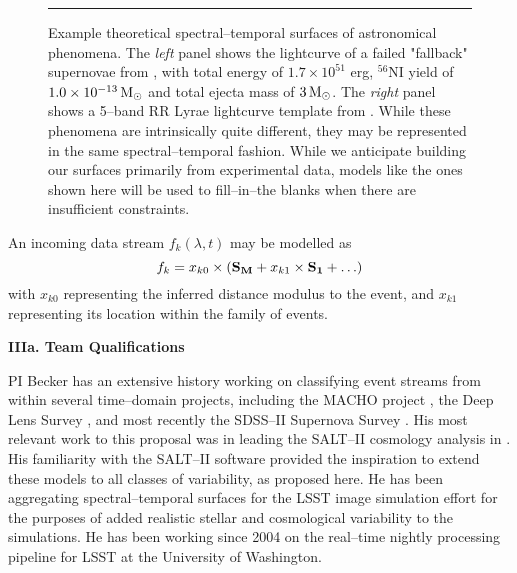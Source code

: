 \begin{figure}[t]
\centerline{ \hfil
{}} \smallskip
\caption[]{\footnotesize Example theoretical spectral--temporal surfaces of
astronomical phenomena.  The {\it left} panel shows the lightcurve of a failed
"fallback" supernovae from \cite{2009ApJ...707..193F}, with total energy of $1.7
\times 10^{51}$ erg, $^{56}$NI yield of $1.0 \times 10^{-13} {\rm\,M_\odot}$ and total
ejecta mass of $3 {\rm\,M_\odot}$.  The {\it right} panel shows a 5--band RR Lyrae
lightcurve template from \cite{2010ApJ...708..717S}.  While these phenomena are
intrinsically quite different, they may be represented in the same
spectral--temporal fashion.  While we anticipate building our surfaces primarily
from experimental data, models like the ones shown here will be used to
fill--in--the blanks when there are insufficient constraints.} \medskip \hrule
\label{fig:sts} \end{figure}


 \smallskip


An incoming data stream $f_{k}(\lambda, t)$ may be modelled as $$f_{k} = x_{k0}
\times ({\bf S_M} + x_{k1} \times {\bf S_1} + \ldots)$$ with $x_{k0}$
representing the inferred distance modulus to the event, and $x_{k1}$
representing its location within the family of events.


 \smallskip





\bigskip \centerline{\bf IIIa. Team Qualifications} \smallskip

 \smallskip

PI Becker has an extensive history working on classifying event streams from
within several time--domain projects, including the MACHO project
\citep{2000PhDT.......258B}, the Deep Lens Survey \citep{2004ApJ...611..418B},
and most recently the SDSS--II Supernova Survey
\citep{2008AJ....135..338F,2008AJ....135..348S}.  His most relevant work to this
proposal was in leading the SALT--II cosmology analysis in
\cite{2009ApJS..185...32K}.  His familiarity with the SALT--II software provided
the inspiration to extend these models to all classes of variability, as
proposed here. He has been aggregating spectral--temporal surfaces for the LSST
image simulation effort \citep{2010SPIE.7738E..53C} for the purposes of added
realistic stellar and cosmological variability to the simulations.  He has been
working since 2004 on the real--time nightly processing pipeline for LSST at the
University of Washington.

